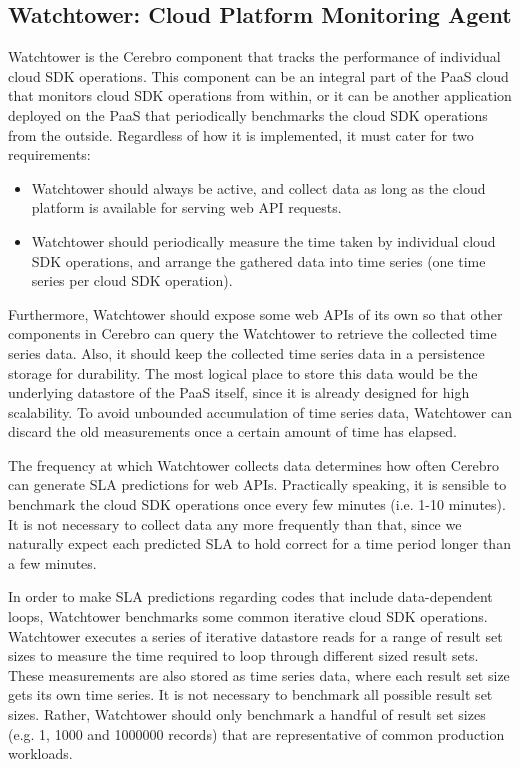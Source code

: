 \subsection{Watchtower: Cloud Platform Monitoring Agent}
Watchtower is the Cerebro component that tracks the performance of individual
cloud SDK operations. This component can be an integral part of the PaaS cloud that
monitors cloud SDK operations from within, or it can be another application deployed on the PaaS
that periodically benchmarks the cloud SDK operations from the outside. Regardless of how it is
implemented, it must cater for two requirements:

\begin{itemize}
\item Watchtower should always be active, and collect data as long as the cloud platform is available for serving web API requests.
\item Watchtower should periodically measure the time taken by individual cloud SDK operations, and arrange the gathered data into time series (one time series per cloud SDK operation).
\end{itemize}

Furthermore, Watchtower should expose some web APIs of its own 
so that other components in Cerebro can query the Watchtower to retrieve the collected time series data. Also,
it should keep the collected time series data in a persistence storage for durability. The most logical
place to store this data would be the underlying datastore of the PaaS itself, since it is already designed
for high scalability. To avoid unbounded accumulation of time series data, Watchtower can discard the old
measurements once a certain amount of time has elapsed. 

The frequency at which
Watchtower collects data determines how often Cerebro can generate SLA predictions for web APIs. Practically
speaking, it is sensible to benchmark the cloud SDK operations once every few minutes (i.e. 1-10 minutes). It is
not necessary to collect data any more frequently than that, since we naturally expect each predicted SLA to 
hold correct for a time period longer than a few minutes.

In order to make SLA predictions regarding codes that include data-dependent loops, Watchtower
benchmarks some common iterative cloud SDK operations. 
Watchtower executes a series of iterative datastore reads
for a range of result set sizes to measure the time required to loop through different sized result sets. These
measurements are also stored as time series data, where each result set size gets its own time series. 
It is not necessary to benchmark all possible result set sizes. Rather, Watchtower should only benchmark a
handful of result set sizes  (e.g. 1, 1000 and 1000000 records) that are representative of common 
production workloads.

